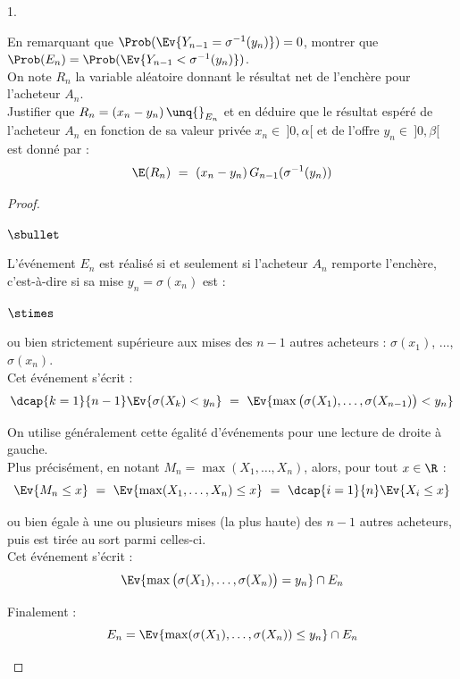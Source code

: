 \documentclass[11pt]{article}%
\begin{document}
\begin{noliste}{1.}
  \setlength{\itemsep}{4mm}
  \setcounter{enumi}{9}
  \item En remarquant que $\Prob(\Ev{Y_{n-1} = \sigma^{-1}(y_n)}) = 0$,
  montrer que $\Prob(E_n) = \Prob(\Ev{Y_{n-1} < \sigma^{-1}(y_n)})$.\\
  On note $R_n$ la variable aléatoire donnant le résultat net de 
  l'enchère pour l'acheteur $A_n$.\\
  Justifier que $R_n = (x_n-y_n) \, \unq{}_{E_n}$ et en déduire que le 
  résultat espéré de l'acheteur $A_n$ en fonction de sa valeur 
  privée $x_n \in \ ]0,\alpha[$ et de l'offre $y_n \in \ ]0,\beta[$ 
  est donné par :
  \[
    \E(R_n) \ = \ (x_n-y_n) \, G_{n-1}(\sigma^{-1}(y_n))
  \]
  
  
  \newpage
  
  
  \begin{proof}~
    \begin{noliste}{$\sbullet$}
      \item L'événement $E_n$ est réalisé si et seulement si 
      l'acheteur $A_n$ remporte l'enchère, c'est-à-dire si sa mise 
      $y_n = \sigma(x_n)$ est :
      \begin{noliste}{$\stimes$}
	\item ou bien strictement supérieure aux mises des 
	$n-1$ autres acheteurs : $\sigma(x_1)$, $\ldots$, 
	$\sigma(x_n)$.\\
	Cet événement s'écrit :
	\[
	  \dcap{k=1}{n-1} \Ev{\sigma(X_k) < y_n}
	  \ = \ \Ev{\max\big( \sigma(X_1), \ldots, \sigma(X_{n-1})\big)
	  < y_n}
	\]
	\begin{remark}
	  On utilise généralement cette égalité d'événements pour une
	  lecture de droite à gauche.\\
	  Plus précisément,
	  en notant $M_n = \max(X_1, \ldots, X_n)$, alors, pour tout 
	  $x \in \R$ :
	  \[
	    \Ev{M_n \leq x} \ = \ \Ev{\max(X_1, \ldots, X_n) \leq x}
	    \ = \ \dcap{i=1}{n} \Ev{X_i \leq x}
	  \]
	\end{remark}
	
	\item ou bien égale à une ou plusieurs mises (la plus haute) 
	des $n-1$ 
	autres acheteurs, puis est tirée au sort parmi celles-ci.\\
	Cet événement s'écrit :
	\[
	  \Ev{\max\big( \sigma(X_1), \ldots, \sigma(X_n)\big)
	  = y_n} \cap E_n
	\]
      \end{noliste}
      Finalement :
      \[
        E_n = \Ev{\max(\sigma(X_1) , \ldots, \sigma(X_n)) \leq 
        y_n} \cap E_n
      \]
      

\end{noliste}
\end{proof}
\end{noliste}
\end{document}
